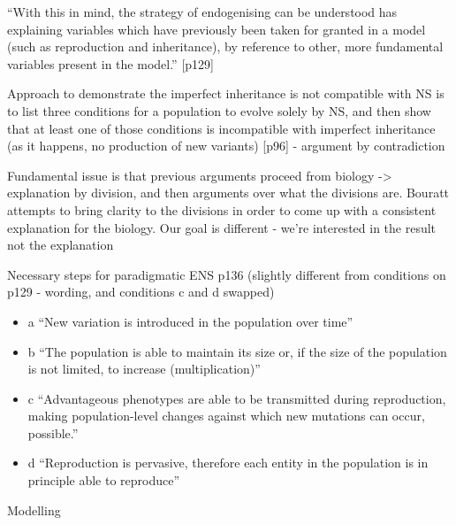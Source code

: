 ``With this in mind, the strategy of endogenising can be understood
has explaining variables which have previously been taken for granted
in a model (such as reproduction and inheritance), by reference to
other, more fundamental variables present in the model.'' {[}p129{]}


Approach to demonstrate the imperfect inheritance is not compatible
with NS is to list three conditions for a population to evolve solely
by NS, and then show that at least one of those conditions is
incompatible with imperfect inheritance (as it happens, no production
of new variants) {[}p96{]} - argument by contradiction


Fundamental issue is that previous arguments proceed from biology
-\textgreater{} explanation by division, and then arguments over what
the divisions are. Bouratt attempts to bring clarity to the divisions
in order to come up with a consistent explanation for the biology. Our
goal is different - we're interested in the result not the explanation

Necessary steps for paradigmatic ENS p136 (slightly different from
conditions on p129 - wording, and conditions c and d swapped)
	
	
\begin{itemize}
	\item
	
	a ``New variation is introduced in the population over time''
	
	\item
	
	b ``The population is able to maintain its size or, if the size of
	the population is not limited, to increase (multiplication)''
	
	\item
	
	c ``Advantageous phenotypes are able to be transmitted during
	reproduction, making population-level changes against which new
	mutations can occur, possible.''
	
	\item
	
	d ``Reproduction is pervasive, therefore each entity in the
	population is in principle able to reproduce''
	
\end{itemize}

	
Modelling
	
